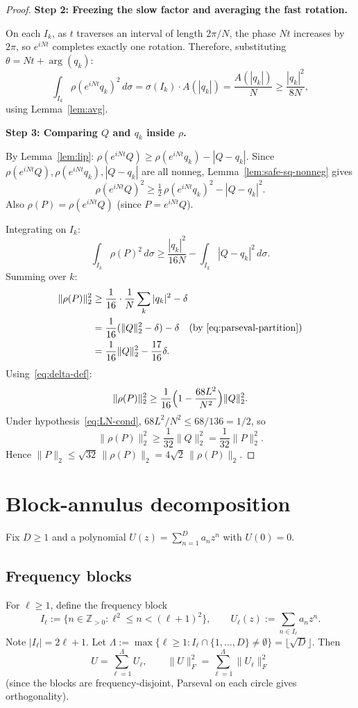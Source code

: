 \documentclass[11pt]{article}
\newcommand{\rhof}{\rho}
\newcommand{\Zpos}{\mathbb{Z}_{>0}}
\newcommand{\norm}[1]{\lVert #1\rVert}
\begin{document}
\begin{proof}
\medskip\noindent\textbf{Step 2: Freezing the slow factor and averaging the fast rotation.}

On each $I_k$, as $t$ traverses an interval of length $2\pi/N$,
the phase $Nt$ increases by $2\pi$, so $e^{iNt}$ completes exactly one rotation.
Therefore, substituting $\theta = Nt + \arg(q_k)$:
\[
  \int_{I_k}\rhof(e^{iNt}q_k)^2\,d\sigma
  = \sigma(I_k)\cdot A(|q_k|)
  = \frac{A(|q_k|)}{N}
  \ge \frac{|q_k|^2}{8N},
\]
using Lemma~\ref{lem:avg}.

\medskip\noindent\textbf{Step 3: Comparing $Q$ and $q_k$ inside $\rhof$.}

By Lemma~\ref{lem:lip}: $\rhof(e^{iNt}Q) \ge \rhof(e^{iNt}q_k) - |Q - q_k|$.
Since $\rhof(e^{iNt}Q), \rhof(e^{iNt}q_k), |Q-q_k|$ are all nonneg, Lemma~\ref{lem:safe-sq-nonneg} gives
\[
  \rhof(e^{iNt}Q)^2 \ge \tfrac12\,\rhof(e^{iNt}q_k)^2 - |Q-q_k|^2.
\]
Also $\rhof(P) = \rhof(e^{iNt}Q)$ (since $P = e^{iNt}Q$).

Integrating on $I_k$:
\[
  \int_{I_k}\rhof(P)^2\,d\sigma
  \ge \frac{|q_k|^2}{16N} - \int_{I_k}|Q-q_k|^2\,d\sigma.
\]
Summing over $k$:
\begin{align}
  \norm{\rhof(P)}_2^2
  &\ge \frac{1}{16}\cdot\frac{1}{N}\sum_k|q_k|^2 - \delta \notag\\
  &= \frac{1}{16}(\norm{Q}_2^2 - \delta) - \delta
  \quad\text{(by~\eqref{eq:parseval-partition})} \notag\\
  &= \frac{1}{16}\norm{Q}_2^2 - \frac{17}{16}\delta. \label{eq:rhoP-lower}
\end{align}
Using~\eqref{eq:delta-def}:
\[
  \norm{\rhof(P)}_2^2 \ge \frac{1}{16}\Bigl(1 - \frac{68 L^2}{N^2}\Bigr)\norm{Q}_2^2.
\]
Under hypothesis~\eqref{eq:LN-cond}, $68L^2/N^2 \le 68/136 = 1/2$, so
\[
  \norm{\rhof(P)}_2^2 \ge \frac{1}{32}\norm{Q}_2^2 = \frac{1}{32}\norm{P}_2^2.
\]
Hence $\norm{P}_2 \le \sqrt{32}\,\norm{\rhof(P)}_2 = 4\sqrt2\,\norm{\rhof(P)}_2$.
\end{proof}

\section{Block-annulus decomposition}\label{sec:block}

Fix $D \ge 1$ and a polynomial $U(z) = \sum_{n=1}^D a_n z^n$ with $U(0) = 0$.

\subsection{Frequency blocks}
For $\ell \ge 1$, define the frequency block
\[
  I_\ell := \{n \in \Zpos : \ell^2 \le n < (\ell+1)^2\},
  \qquad
  U_\ell(z) := \sum_{n\in I_\ell}a_n z^n.
\]
Note $|I_\ell| = 2\ell+1$.
Let $\Lambda := \max\{\ell \ge 1 : I_\ell \cap \{1,\ldots,D\} \ne \emptyset\}
= \lfloor\sqrt{D}\rfloor$.
Then
\[
  U = \sum_{\ell=1}^{\Lambda}U_\ell, \qquad
  \norm{U}_F^2 = \sum_{\ell=1}^{\Lambda}\norm{U_\ell}_F^2
\]
(since the blocks are frequency-disjoint, Parseval on each circle gives orthogonality).
\end{document}
